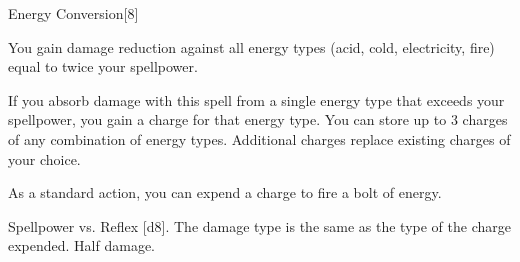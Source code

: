 \begin{spellsection}{Energy Conversion}[8]
    \begin{spellheader}
    \end{spellheader}
    \begin{spellcontent}
        \begin{spelleffects}
            \spelleffect You gain damage reduction against all energy types (acid, cold, electricity, fire) equal to twice your spellpower.

            If you absorb damage with this spell from a single energy type that exceeds your spellpower, you gain a charge for that energy type. You can store up to 3 charges of any combination of energy types. Additional charges replace existing charges of your choice.
            \spelldur \durlong
        \end{spelleffects}
    \end{spellcontent}
    \begin{spellsubcontent}
        \begin{spelltargetinginfo}
            \spellspecial As a standard action, you can expend a charge to fire a bolt of energy.
        \end{spelltargetinginfo}
        \begin{spelleffects}
            \begin{spellattack}{Spellpower vs. Reflex}
                \spellsuccess {}[d8]. The damage type is the same as the type of the charge expended.
                \spellfailure Half damage.
            \end{spellattack}
        \end{spelleffects}
    \end{spellsubcontent}
    \begin{spellfooter}
        \miscastexplode
    \end{spellfooter}
\end{spellsection}

